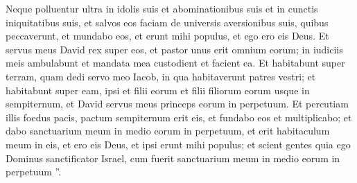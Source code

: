 \begin{biblechapter}
\begin{biblechapter}
\begin{biblechapter}
\begin{biblechapter}
\begin{biblechapter}
\begin{biblechapter}
\begin{biblechapter}
\begin{biblechapter}
\begin{biblechapter}
\begin{biblechapter}
\begin{biblechapter}
\begin{biblechapter}
\begin{biblechapter}
\begin{biblechapter}
\begin{biblechapter}
\begin{biblechapter}
\begin{biblechapter}
\begin{biblechapter}
\begin{biblechapter}
\begin{biblechapter}
\begin{biblechapter}
\begin{biblechapter}
\begin{biblechapter}
\begin{biblechapter}
\begin{biblechapter}
\begin{biblechapter}
\begin{biblechapter}
\begin{biblechapter}
\begin{biblechapter}
\begin{biblechapter}
\begin{biblechapter}
\begin{biblechapter}
\begin{biblechapter}
\begin{biblechapter}
\begin{biblechapter}
\begin{biblechapter}
\begin{biblechapter}
\verse Neque polluentur ultra in idolis suis et abominationibus suis et in cunctis iniquitatibus suis, et salvos eos faciam de universis aversionibus suis, quibus peccaverunt, et mundabo eos, et erunt mihi populus, et ego ero eis Deus. 
\verse Et servus meus David rex super eos, et pastor unus erit omnium eorum; in iudiciis meis ambulabunt et mandata mea custodient et facient ea. 
\verse Et habitabunt super terram, quam dedi servo meo Iacob, in qua habitaverunt patres vestri; et habitabunt super eam, ipsi et filii eorum et filii filiorum eorum usque in sempiternum, et David servus meus princeps eorum in perpetuum. 
\verse Et percutiam illis foedus pacis, pactum sempiternum erit eis, et fundabo eos et multiplicabo; et dabo sanctuarium meum in medio eorum in perpetuum, 
\verse et erit habitaculum meum in eis, et ero eis Deus, et ipsi erunt mihi populus; 
\verse et scient gentes quia ego Dominus sanctificator Israel, cum fuerit sanctuarium meum in medio eorum in perpetuum ”.
 

\end{biblechapter}
\end{biblechapter}
\end{biblechapter}
\end{biblechapter}
\end{biblechapter}
\end{biblechapter}
\end{biblechapter}
\end{biblechapter}
\end{biblechapter}
\end{biblechapter}
\end{biblechapter}
\end{biblechapter}
\end{biblechapter}
\end{biblechapter}
\end{biblechapter}
\end{biblechapter}
\end{biblechapter}
\end{biblechapter}
\end{biblechapter}
\end{biblechapter}
\end{biblechapter}
\end{biblechapter}
\end{biblechapter}
\end{biblechapter}
\end{biblechapter}
\end{biblechapter}
\end{biblechapter}
\end{biblechapter}
\end{biblechapter}
\end{biblechapter}
\end{biblechapter}
\end{biblechapter}
\end{biblechapter}
\end{biblechapter}
\end{biblechapter}
\end{biblechapter}
\end{biblechapter}
